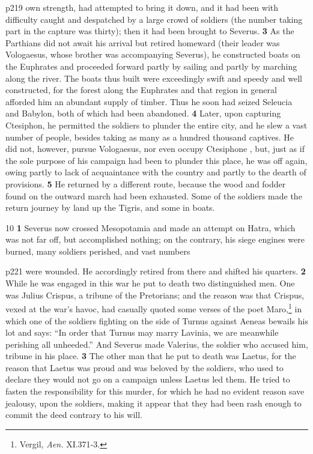 p219 own strength, had attempted to bring it down, and it had been with difficulty caught and despatched by a large crowd of soldiers (the number taking part in the capture was thirty); then it had been brought to Severus. \textbf{3} As the Parthians did not await his arrival but retired homeward (their leader was Vologaesus, whose brother was accompanying Severus), he constructed boats on the Euphrates and proceeded forward partly by sailing and partly by marching along the river. The boats thus built were exceedingly swift and speedy and well constructed, for the forest along the Euphrates and that region in general afforded him an abundant supply of timber. Thus he soon had seized Seleucia and Babylon, both of which had been abandoned. \textbf{4} Later, upon capturing Ctesiphon, he permitted the soldiers to plunder the entire city, and he slew a vast number of people, besides taking as many as a hundred thousand captives. He did not, however, pursue Vologaesus, nor even occupy Ctesiphone , but, just as if the sole purpose of his campaign had been to plunder this place, he was off again, owing partly to lack of acquaintance with the country and partly to the dearth of provisions. \textbf{5} He returned by a different route, because the wood and fodder found on the outward march had been exhausted. Some of the soldiers made the return journey by land up the Tigris, and some in boats.

10
\textbf{1} Severus now crossed Mesopotamia and made an attempt on Hatra, which was not far off, but accomplished nothing; on the contrary, his siege engines were burned, many soldiers perished, and vast numbers

p221 were wounded. He accordingly retired from there and shifted his quarters. \textbf{2} While he was engaged in this war he put to death two distinguished men. One was Julius Crispus, a tribune of the Pretorians; and the reason was that Crispus, vexed at the war's havoc, had casually quoted some verses of the poet Maro,\texthebrew{⁠}\footnote{Vergil, \emph{Aen.} XI.371\texthebrew{‑}3.

} in which one of the soldiers fighting on the side of Turnus against Aeneas bewails his lot and says: ``In order that Turnus may marry Lavinia, we are meanwhile perishing all unheeded.'' And Severus made Valerius, the soldier who accused him, tribune in his place. \textbf{3} The other man that he put to death was Laetus, for the reason that Laetus was proud and was beloved by the soldiers, who used to declare they would not go on a campaign unless Laetus led them. He tried to fasten the responsibility for this murder, for which he had no evident reason save jealousy, upon the soldiers, making it appear that they had been rash enough to commit the deed contrary to his will.

